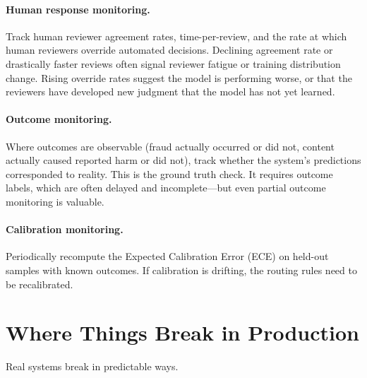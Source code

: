 \paragraph{Human response monitoring.} Track human reviewer agreement rates, time-per-review, and the rate at which human reviewers override automated decisions. Declining agreement rate or drastically faster reviews often signal reviewer fatigue or training distribution change. Rising override rates suggest the model is performing worse, or that the reviewers have developed new judgment that the model has not yet learned.

\paragraph{Outcome monitoring.} Where outcomes are observable (fraud actually occurred or did not, content actually caused reported harm or did not), track whether the system's predictions corresponded to reality. This is the ground truth check. It requires outcome labels, which are often delayed and incomplete---but even partial outcome monitoring is valuable.

\paragraph{Calibration monitoring.} Periodically recompute the Expected Calibration Error (ECE) on held-out samples with known outcomes. If calibration is drifting, the routing rules need to be recalibrated.

\section{Where Things Break in Production}
\label{sec:ch08-failure-modes}

Real \hitl systems break in predictable ways.

